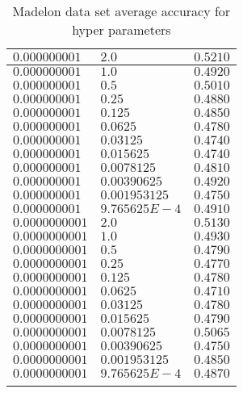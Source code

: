 \begin{enumerate}
\begin{longtable}{| p{}  |  p{} |p{}  |}
      $0.000000001$ & $2.0$ & $0.5210$ \\
      \hline
      $0.000000001$ & $1.0$ & $0.4920$ \\
      \hline
      $0.000000001$ & $0.5$ & $0.5010$ \\
      \hline
      $0.000000001$ & $0.25$ & $0.4880$ \\
      \hline
      $0.000000001$ & $0.125$ & $0.4850$ \\
      \hline
      $0.000000001$ & $0.0625$ & $0.4780$ \\
      \hline
      $0.000000001$ & $0.03125$ & $0.4740$ \\
      \hline
      $0.000000001$ & $0.015625$ & $0.4740$ \\
      \hline
      $0.000000001$ & $0.0078125$ & $0.4810$ \\
      \hline
      $0.000000001$ & $0.00390625$ & $0.4920$ \\
      \hline
      $0.000000001$ & $0.001953125$ & $0.4750$ \\
      \hline
      $0.000000001$ & $9.765625E-4$ & $0.4910$ \\
      \hline    
      
      
      $0.0000000001$ & $2.0$ & $0.5130$ \\
      \hline
      $0.0000000001$ & $1.0$ & $0.4930$ \\
      \hline
      $0.0000000001$ & $0.5$ & $0.4790$ \\
      \hline
      $0.0000000001$ & $0.25$ & $0.4770$ \\
      \hline
      $0.0000000001$ & $0.125$ & $0.4780$ \\
      \hline
      $0.0000000001$ & $0.0625$ & $0.4710$ \\
      \hline
      $0.0000000001$ & $0.03125$ & $0.4780$ \\
      \hline
      $0.0000000001$ & $0.015625$ & $0.4790$ \\
      \hline
      $0.0000000001$ & $0.0078125$ & $0.5065$ \\
      \hline
      $0.0000000001$ & $0.00390625$ & $0.4750$ \\
      \hline
      $0.0000000001$ & $0.001953125$ & $0.4850$ \\
      \hline
      $0.0000000001$ & $9.765625E-4$ & $0.4870$ \\
      \hline    
     \caption{Madelon data set average accuracy for hyper parameters}
  \end{longtable}  


\end{enumerate}
